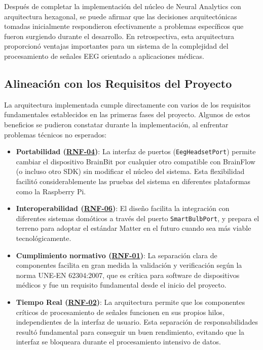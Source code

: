 Después de completar la implementación del núcleo de Neural Analytics con arquitectura hexagonal, se puede afirmar que las decisiones arquitectónicas tomadas inicialmente respondieron efectivamente a problemas específicos que fueron surgiendo durante el desarrollo. En retrospectiva, esta arquitectura proporcionó ventajas importantes para un sistema de la complejidad del procesamiento de señales EEG orientado a aplicaciones médicas.

\subsection{Alineación con los Requisitos del Proyecto}

La arquitectura implementada cumple directamente con varios de los requisitos fundamentales establecidos en las primeras fases del proyecto. Algunos de estos beneficios se pudieron constatar durante la implementación, al enfrentar problemas técnicos no esperados:

\begin{itemize}
    \item \textbf{Portabilidad (\hyperref[rnf-04]{RNF-04})}: La interfaz de puertos (\texttt{EegHeadsetPort}) permite cambiar el dispositivo BrainBit por cualquier otro compatible con BrainFlow (o incluso otro SDK) sin modificar el núcleo del sistema. Esta flexibilidad facilitó considerablemente las pruebas del sistema en diferentes plataformas como la Raspberry Pi.
    
    \item \textbf{Interoperabilidad (\hyperref[rnf-06]{RNF-06})}: El diseño facilita la integración con diferentes sistemas domóticos a través del puerto \texttt{SmartBulbPort}, y prepara el terreno para adoptar el estándar Matter en el futuro cuando sea más viable tecnológicamente.
    
    \item \textbf{Cumplimiento normativo (\hyperref[rnf-01]{RNF-01})}: La separación clara de componentes facilita en gran medida la validación y verificación según la norma UNE-EN 62304:2007, que es crítica para software de dispositivos médicos y fue un requisito fundamental desde el inicio del proyecto.
    
    \item \textbf{Tiempo Real (\hyperref[rnf-02]{RNF-02})}: La arquitectura permite que los componentes críticos de procesamiento de señales funcionen en sus propios hilos, independientes de la interfaz de usuario. Esta separación de responsabilidades resultó fundamental para conseguir un buen rendimiento, evitando que la interfaz se bloqueara durante el procesamiento intensivo de datos.
\end{itemize}

